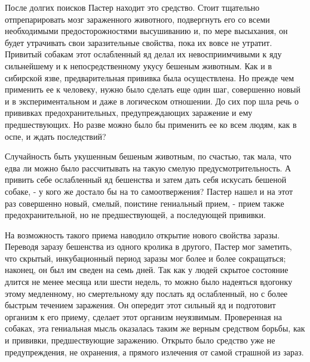 После долгих  поисков  Пастер  находит  это  средство.  Стоит  тщательно
отпрепарировать мозг  зараженного животного,  подвергнуть его  со  всеми
необходимыми предосторожностями  высушиванию и,  по мере  высыхания,  он
будет утрачивать свои заразительные свойства, пока их вовсе не  утратит.
Привитый собакам этот  ослабленный яд  делал их  невосприимчивыми к  яду
сильнейшему и  к  непосредственному  укусу бешеным  животным.  Как  и  в
сибирской язве, предварительная  прививка была  осуществлена. Но  прежде
чем применить ее к человеку, нужно было сделать еще один шаг, совершенно
новый и в экспериментальном  и даже в логическом  отношении. До сих  пор
шла речь о прививках предохранительных, предупреждающих заражение и  ему
предшествующих. Но разве можно было бы применить ее ко всем людям, как в
оспе, и ждать последствий?

Случайность быть укушенным бешеным животным,  по счастью, так мала,  что
едва ли можно было рассчитывать на такую смелую предусмотрительность.  А
привить себе ослабленный яд бешенства и затем дать себя искусать бешеной
собаке, - у кого же достало бы  на то самоотвержения? Пастер нашел и  на
этот раз совершенно  новый, смелый, поистине  гениальный прием, -  прием
также предохранительной, но не предшествующей, а последующей прививки.

На возможность такого приема  наводило открытие нового свойства  заразы.
Переводя заразу  бешенства  из  одного кролика  в  другого,  Пастер  мог
заметить, что скрытый,  инкубационный период  заразы мог  более и  более
сокращаться; наконец, он  был им сведен  на семь дней.  Так как у  людей
скрытое состояние длится не менее месяца или шести недель, то можно было
надеяться вдогонку  этому медленному,  но  смертельному яду  послать  яд
ослабленный, но с  более быстрым  течением заражения.  Он опередит  этот
сильный яд и  подготовит организм  к его приему,  сделает этот  организм
неуязвимым. Проверенная на собаках, эта гениальная мысль оказалась таким
же верным средством  борьбы, как и  прививки, предшествующие  заражению.
Открыто было средство  уже не  предупреждения, не  охранения, а  прямого
излечения от самой страшной из зараз.

